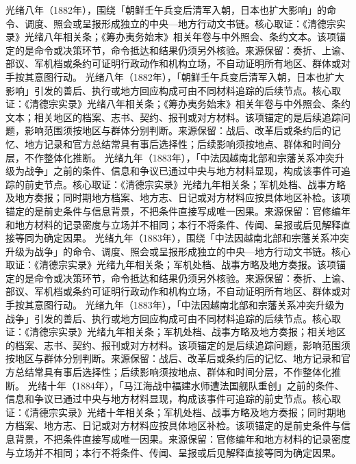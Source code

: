 光绪八年（1882年），围绕「朝鲜壬午兵变后清军入朝，日本也扩大影响」的命令、调度、照会或呈报形成独立的中央—地方行动文书链。核心取证：《清德宗实录》光绪八年相关条；《筹办夷务始末》相关年卷与中外照会、条约文本。该项锚定的是命令或决策环节，命令抵达和结果仍须另外核验。来源保留：奏折、上谕、部议、军机档或条约可证明行政动作和机构立场，不自动证明所有地区、群体或对手按其意图行动。
光绪八年（1882年），「朝鲜壬午兵变后清军入朝，日本也扩大影响」引发的善后、执行或地方回应构成可由不同材料追踪的后续节点。核心取证：《清德宗实录》光绪八年相关条；《筹办夷务始末》相关年卷与中外照会、条约文本；相关地区的档案、志书、契约、报刊或对方材料。该项锚定的是后续追踪问题，影响范围须按地区与群体分别判断。来源保留：战后、改革后或条约后的记忆、地方记录和官方总结常具有事后选择性；后续影响须按地点、群体和时间分层，不作整体化推断。
光绪九年（1883年），「中法因越南北部和宗藩关系冲突升级为战争」之前的条件、信息和争议已通过中央与地方材料显现，构成该事件可追踪的前史节点。核心取证：《清德宗实录》光绪九年相关条；军机处档、战事方略及地方奏报；同时期地方档案、地方志、日记或对方材料应按具体地区补检。该项锚定的是前史条件与信息背景，不把条件直接写成唯一因果。来源保留：官修编年和地方材料的记录密度与立场并不相同；本行不将条件、传闻、呈报或后见解释直接等同为确定因果。
光绪九年（1883年），围绕「中法因越南北部和宗藩关系冲突升级为战争」的命令、调度、照会或呈报形成独立的中央—地方行动文书链。核心取证：《清德宗实录》光绪九年相关条；军机处档、战事方略及地方奏报。该项锚定的是命令或决策环节，命令抵达和结果仍须另外核验。来源保留：奏折、上谕、部议、军机档或条约可证明行政动作和机构立场，不自动证明所有地区、群体或对手按其意图行动。
光绪九年（1883年），「中法因越南北部和宗藩关系冲突升级为战争」引发的善后、执行或地方回应构成可由不同材料追踪的后续节点。核心取证：《清德宗实录》光绪九年相关条；军机处档、战事方略及地方奏报；相关地区的档案、志书、契约、报刊或对方材料。该项锚定的是后续追踪问题，影响范围须按地区与群体分别判断。来源保留：战后、改革后或条约后的记忆、地方记录和官方总结常具有事后选择性；后续影响须按地点、群体和时间分层，不作整体化推断。
光绪十年（1884年），「马江海战中福建水师遭法国舰队重创」之前的条件、信息和争议已通过中央与地方材料显现，构成该事件可追踪的前史节点。核心取证：《清德宗实录》光绪十年相关条；军机处档、战事方略及地方奏报；同时期地方档案、地方志、日记或对方材料应按具体地区补检。该项锚定的是前史条件与信息背景，不把条件直接写成唯一因果。来源保留：官修编年和地方材料的记录密度与立场并不相同；本行不将条件、传闻、呈报或后见解释直接等同为确定因果。
